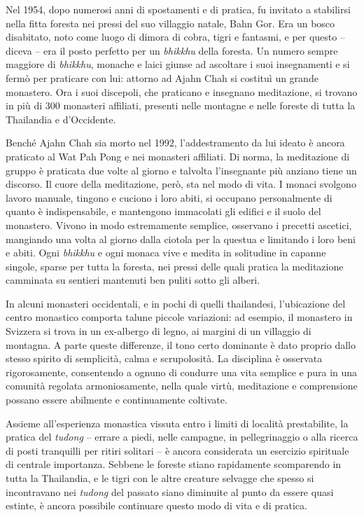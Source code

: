 Nel 1954, dopo numerosi anni di spostamenti e di pratica, fu invitato a
stabilirsi nella fitta foresta nei pressi del suo villaggio natale, Bahn
Gor. Era un bosco disabitato, noto come luogo di dimora di cobra, tigri
e fantasmi, e per questo -- diceva -- era il posto perfetto per un
\emph{bhikkhu} della foresta. Un numero sempre maggiore di
\emph{bhikkhu}, monache e laici giunse ad ascoltare i suoi insegnamenti
e si fermò per praticare con lui: attorno ad Ajahn Chah si costituì un
grande monastero. Ora i suoi discepoli, che praticano e insegnano
meditazione, si trovano in più di 300 monasteri affiliati, presenti
nelle montagne e nelle foreste di tutta la Thailandia e d'Occidente.

Benché Ajahn Chah sia morto nel 1992, l'addestramento da lui ideato è
ancora praticato al Wat Pah Pong e nei monasteri affiliati. Di norma, la
meditazione di gruppo è praticata due volte al giorno e talvolta
l'insegnante più anziano tiene un discorso. Il cuore della meditazione,
però, sta nel modo di vita. I monaci svolgono lavoro manuale, tingono e
cuciono i loro abiti, si occupano personalmente di quanto è
indispensabile, e mantengono immacolati gli edifici e il suolo del
monastero. Vivono in modo estremamente semplice, osservano i precetti
ascetici, mangiando una volta al giorno dalla ciotola per la questua e
limitando i loro beni e abiti. Ogni \emph{bhikkhu} e ogni monaca vive e
medita in solitudine in capanne singole, sparse per tutta la foresta,
nei pressi delle quali pratica la meditazione camminata su sentieri
mantenuti ben puliti sotto gli alberi.

In alcuni monasteri occidentali, e in pochi di quelli thailandesi,
l'ubicazione del centro monastico comporta talune piccole variazioni: ad
esempio, il monastero in Svizzera si trova in un ex-albergo di legno, ai
margini di un villaggio di montagna. A parte queste differenze, il tono
certo dominante è dato proprio dallo stesso spirito di semplicità, calma
e scrupolosità. La disciplina è osservata rigorosamente, consentendo a
ognuno di condurre una vita semplice e pura in una comunità regolata
armoniosamente, nella quale virtù, meditazione e comprensione possano
essere abilmente e continuamente coltivate.

Assieme all'esperienza monastica vissuta entro i limiti di località
prestabilite, la pratica del \emph{tudong} -- errare a piedi, nelle
campagne, in pellegrinaggio o alla ricerca di posti tranquilli per
ritiri solitari -- è ancora considerata un esercizio spirituale di
centrale importanza. Sebbene le foreste stiano rapidamente scomparendo
in tutta la Thailandia, e le tigri con le altre creature selvagge che
spesso si incontravano nei \emph{tudong} del passato siano diminuite al
punto da essere quasi estinte, è ancora possibile continuare questo modo
di vita e di pratica.

